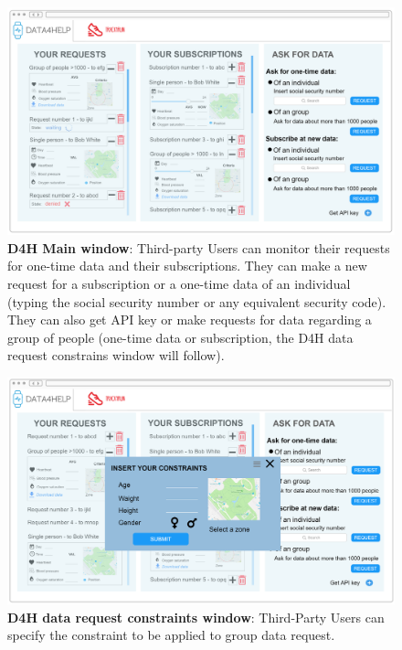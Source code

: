 \begin{figure}[H]
\centering
\includegraphics[scale = 0.5]{Mocks/Desktop_D4H_Main.PNG}
\caption{\textbf{D4H Main window}: Third-party Users can monitor their requests for one-time data and their subscriptions. They can make a new request for a subscription or a one-time data of an individual (typing the social security number or any equivalent security code). They can also get API key or make requests for data regarding a group of people (one-time data or subscription, the D4H data request constrains window will follow).}
\end{figure}

\begin{figure}[H]
\centering
\includegraphics[scale = 0.5]{Mocks/Desktop_D4H_Constraints.PNG}
\caption{\textbf{D4H data request constraints window}: Third-Party Users can specify the constraint to be applied to group data request.}
\end{figure}


